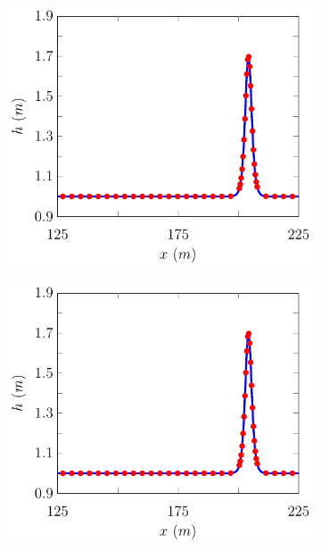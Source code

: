 \begin{figure}
\begin{subfigure}{0.5\textwidth}
		\vspace{0.5cm}
	\end{subfigure}
	\begin{subfigure}{0.5\textwidth}
		\includegraphics[width=\textwidth]{./chp5/figures/Analytic/Soliton/Example/FEVM2.pdf}
		\vspace{0.5cm}
	\end{subfigure}%
	\begin{subfigure}{0.5\textwidth}
		\includegraphics[width=\textwidth]{./chp5/figures/Analytic/Soliton/Example/FDVM3.pdf}

\end{subfigure}
\end{figure}
